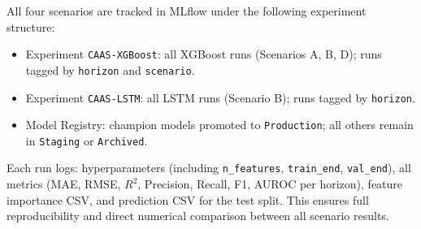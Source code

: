 \documentclass[12pt,a4paper]{report}
\begin{document}
All four scenarios are tracked in MLflow under the following experiment structure:

\begin{itemize}
  \item Experiment \texttt{CAAS-XGBoost}: all XGBoost runs (Scenarios A, B, D); runs tagged by \texttt{horizon} and \texttt{scenario}.
  \item Experiment \texttt{CAAS-LSTM}: all LSTM runs (Scenario B); runs tagged by \texttt{horizon}.
  \item Model Registry: champion models promoted to \texttt{Production}; all others remain in \texttt{Staging} or \texttt{Archived}.
\end{itemize}

Each run logs: hyperparameters (including \texttt{n\_features}, \texttt{train\_end}, \texttt{val\_end}), all metrics (MAE, RMSE, $R^2$, Precision, Recall, F1, AUROC per horizon), feature importance CSV, and prediction CSV for the test split. This ensures full reproducibility and direct numerical comparison between all scenario results.

\renewcommand{\bibname}{REFERENCES}
\end{document}
